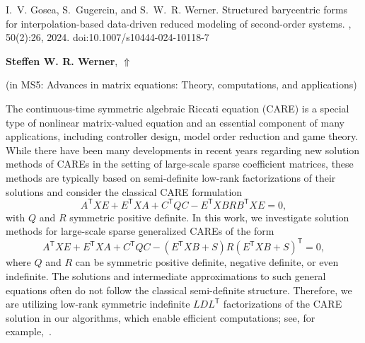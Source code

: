 \documentclass[ILAS2025-program.tex]{subfiles}
\begin{document}
\begin{ilasabstract}
\begin{bibunit}
\begin{thebibliography}{10}
  I.~V. Gosea, S.~Gugercin, and S.~W.~R. Werner.
  \newblock Structured barycentric forms for interpolation-based data-driven
    reduced modeling of second-order systems.
  , 50(2):26, 2024.
  \newblock doi:10.1007/s10444-024-10118-7
\end{thebibliography}

        \end{bibunit}
        
\end{ilasabstract}
    

\hypertarget{down0363}{}\begin{ilasabstract}
    
\textbf{Steffen W. R. Werner},  \hfill \hyperlink{up0363}{$\Uparrow$}
    
    
(in {\color{mstitle}MS5: Advances in matrix equations: Theory, computations, and applications})
        
\mtskip
    \begin{bibunit}
        The continuous-time symmetric algebraic Riccati equation (CARE) is a special
type of nonlinear matrix-valued equation and an essential component
of many applications, including controller design, model order reduction and
game theory.
While there have been many developments in recent years regarding new solution
methods of CAREs in the setting of large-scale sparse coefficient matrices,
these methods are typically based on semi-definite low-rank factorizations of
their solutions and consider the classical CARE formulation
\begin{equation*}
  A^{\mathsf{T}} X E + E^{\mathsf{T}} X A + C^{\mathsf{T}} Q C -
    E^{\mathsf{T}} X B R B^{\mathsf{T}} X E = 0,
\end{equation*}
with $Q$ and $R$ symmetric positive definite.
In this work, we investigate solution methods for large-scale sparse generalized
CAREs of the form
\begin{equation*}
  A^{\mathsf{T}} X E + E^{\mathsf{T}} X A + C^{\mathsf{T}} Q C -
    (E^{\mathsf{T}} X B + S) R (E^{\mathsf{T}} X B + S)^{\mathsf{T}} = 0,
\end{equation*}
where $Q$ and $R$ can be symmetric positive definite,  negative definite,
or even indefinite.
The solutions and intermediate approximations to such general equations often
do not follow the classical semi-definite structure.
Therefore, we are utilizing low-rank symmetric indefinite $LDL^{\mathsf{T}}$
factorizations of the CARE solution in our algorithms, which enable efficient
computations; see, for example,~\cite{Werner_SaaW24}.


\end{bibunit}
\end{ilasabstract}
\end{document}
